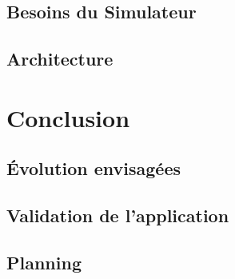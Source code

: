 \documentclass{scrreprt}
\begin{document}
\newpage
\section{Besoins du Simulateur}


\newpage
\section{Architecture}


\newpage
\chapter{Conclusion}

\newpage
\section{Évolution envisagées}

\newpage
\section{Validation de l'application}

\newpage
\section{Planning}
\end{document}
